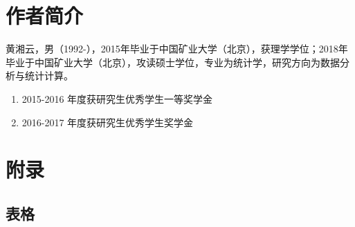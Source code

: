 \documentclass[12pt,a4paper,UTF8,twoside]{book}
\providecommand{\tightlist}{%
  \setlength{\itemsep}{0pt}\setlength{\parskip}{0pt}}
\theoremstyle{definition}
\theoremstyle{definition}
\theoremstyle{definition}
\theoremstyle{remark}
\begin{document}
\hypertarget{author}{%
\chapter*{作者简介}\label{author}}


黄湘云，男（1992-），2015年毕业于中国矿业大学（北京），获理学学位；2018年毕业于中国矿业大学（北京），攻读硕士学位，专业为统计学，研究方向为数据分析与统计计算。

\begin{center} \kaishu {}\end{center}

\begin{enumerate}
\def\labelenumi{\arabic{enumi}.}
\tightlist
\item
  2015-2016 年度获研究生优秀学生一等奖学金
\item
  2016-2017 年度获研究生优秀学生奖学金
\end{enumerate}

\cleardoublepage

\hypertarget{appendix}{%
\chapter*{附录}\label{appendix}}


\hypertarget{tables-simulations}{%
\section*{表格}\label{tables-simulations}}
\end{document}
